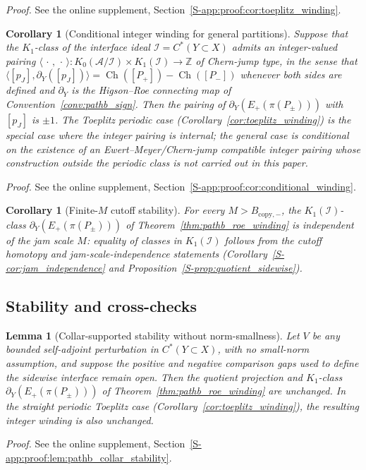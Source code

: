 \documentclass[11pt]{article}
\numberwithin{equation}{section}
\newtheorem{lemma}[theorem]{Lemma}
\newtheorem{corollary}[theorem]{Corollary}
\theoremstyle{definition}
\theoremstyle{remark}
\newcommand{\proofsuppref}[1]{%
  \par\noindent\emph{Proof.} See the online supplement, Section~\ref{S-#1}.\par\medskip
}
\newcommand{\Ch}{\operatorname{Ch}}
\begin{document}
\proofsuppref{app:proof:cor:toeplitz_winding}

\begin{corollary}[Conditional integer winding for general partitions]\label{cor:conditional_winding}
Suppose that the \(K_1\)-class of the interface ideal \(\mathcal I=C^*(Y\subset X)\) admits
an integer-valued pairing \(\langle\,\cdot\,,\,\cdot\,\rangle:K_0(\mathcal A/\mathcal I)\times
K_1(\mathcal I)\to\mathbb Z\) of Chern-jump type, in the sense that
\(\langle [p_J],\partial_Y([p_J])\rangle=\Ch([P_+])-\Ch([P_-])\) whenever both sides are
defined and \(\partial_Y\) is the Higson--Roe connecting map of
Convention~\ref{conv:pathb_sign}. Then the pairing of
\(\partial_Y(E_+(\pi(P_\pm)))\) with \([p_J]\) is \(\pm1\). The Toeplitz periodic case
(Corollary~\ref{cor:toeplitz_winding}) is the special case where the integer pairing is
internal; the general case is conditional on the existence of an Ewert--Meyer/Chern-jump
compatible integer pairing whose construction outside the periodic class is not carried out in
this paper.
\end{corollary}
\proofsuppref{app:proof:cor:conditional_winding}

\begin{corollary}[Finite-\(M\) cutoff stability]\label{cor:pathb_finite_m_winding}
For every \(M>B_{\mathrm{copy},-}\), the \(K_1(\mathcal I)\)-class
\(\partial_Y(E_+(\pi(P_\pm)))\) of Theorem~\ref{thm:pathb_roe_winding} is independent of the
jam scale \(M\): equality of classes in \(K_1(\mathcal I)\) follows from the cutoff
homotopy and jam-scale-independence statements
(Corollary~\ref{S-cor:jam_independence} and Proposition~\ref{S-prop:quotient_sidewise}).
\end{corollary}

\subsection{Stability and cross-checks}

\begin{lemma}[Collar-supported stability without norm-smallness]\label{lem:pathb_collar_stability}
Let $V$ be any bounded self-adjoint perturbation in $C^*(Y\subset X)$, with no small-norm
assumption, and suppose the positive and negative comparison gaps used to define the sidewise
interface remain open. Then the quotient projection and \(K_1\)-class
\(\partial_Y(E_+(\pi(P_\pm)))\) of Theorem~\ref{thm:pathb_roe_winding} are unchanged. In the
straight periodic Toeplitz case (Corollary~\ref{cor:toeplitz_winding}), the resulting integer
winding is also unchanged.
\end{lemma}
\proofsuppref{app:proof:lem:pathb_collar_stability}
\end{document}
